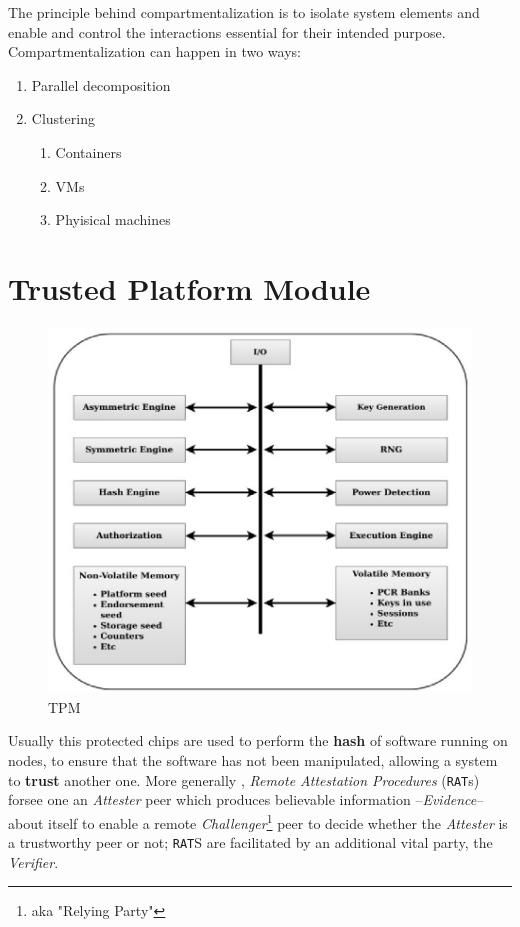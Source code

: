The principle behind compartmentalization is to isolate system elements and enable and control the
interactions essential for their intended purpose.
Compartmentalization can happen in two ways:
\begin{enumerate}
   \item Parallel decomposition
   \item Clustering
   \begin{enumerate}
      \item Containers
      \item VMs
      \item Phyisical machines
   \end{enumerate}
\end{enumerate}

\section{Trusted Platform Module}
\begin{figure}[htbp]
   \centering
   \includegraphics{images/tpm.png}
   \caption{TPM}
   \label{fig:tpm}
\end{figure}

Usually this protected chips are used to perform the \textbf{hash} of software running on nodes,
to ensure that the software has not been manipulated,
allowing a system to \textbf{trust} another one.
More generally , \textit{Remote Attestation Procedures} (\texttt{RAT}s) forsee one an \textit{Attester} peer which produces
believable information {--}\textit{Evidence}{--} about itself to enable a remote \textit{Challenger}\footnote{aka "Relying Party"} peer to decide whether the \textit{Attester} is a trustworthy peer
or not;
\texttt{RAT}S are facilitated by an additional vital party, the \textit{Verifier}.


